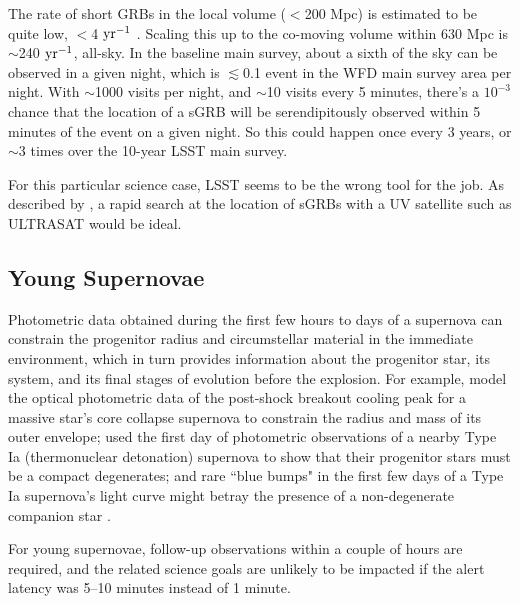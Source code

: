 \documentclass[DM,lsstdraft,authoryear,toc]{lsstdoc}
\begin{document}
The rate of short GRBs in the local volume ($<$200 Mpc) is estimated to be quite low, $<$4 $\rm yr^{-1}$ \citep{2019arXiv190800100M}. Scaling this up to the co-moving volume within 630 Mpc is $\sim$240 $\rm yr^{-1}$, all-sky. In the baseline main survey, about a sixth of the sky can be observed in a given night, which is $\lesssim$0.1 event in the WFD main survey area per night. With $\sim$1000 visits per night, and $\sim$10 visits every 5 minutes, there's a $10^{-3}$ chance that the location of a sGRB will be serendipitously observed within 5 minutes of the event on a given night. So this could happen once every 3 years, or $\sim$3 times over the 10-year LSST main survey.

For this particular science case, LSST seems to be the wrong tool for the job. As described by \citet{2018MNRAS.473..576G}, a rapid search at the location of sGRBs with a UV satellite such as ULTRASAT would be ideal.



\subsection{Young Supernovae}\label{ssec:latency_ysne}

Photometric data obtained during the first few hours to days of a supernova can constrain the progenitor radius and circumstellar material in the immediate environment, which in turn provides information about the progenitor star, its system, and its final stages of evolution before the explosion.  For example, \citet{2018Natur.554..497B} model the optical photometric data of the post-shock breakout cooling peak for a massive star's core collapse supernova to constrain the radius and mass of its outer envelope; \citet{2012ApJ...744L..17B} used the first day of photometric observations of a nearby Type Ia (thermonuclear detonation) supernova to show that their progenitor stars must be a compact degenerates; and rare ``blue bumps" in the first few days of a Type Ia supernova's light curve might betray the presence of a non-degenerate companion star \citep[e.g.,][]{2010ApJ...708.1025K,2017ApJ...845L..11H}.

For young supernovae, follow-up observations within a couple of hours are required, and the related science goals are unlikely to be impacted if the alert latency was 5--10 minutes instead of 1 minute.
\end{document}
